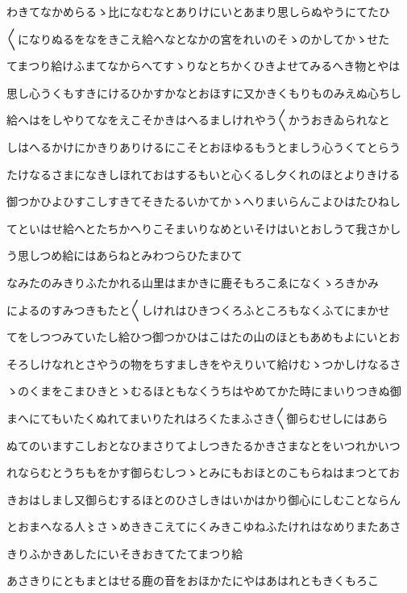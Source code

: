 \documentclass[a4paper,11pt,landscape]{ltjtarticle}
\begin{document}
\par\medskip
わきてなかめらるゝ比になむなとありけにいとあまり思しらぬやうにてたひ
\par\medskip
〱になりぬるをなをきこえ給へなとなかの宮をれいのそゝのかしてかゝせた
\par\medskip
てまつり給けふまてなからへてすゝりなとちかくひきよせてみるへき物とやは
\par\medskip
思し心うくもすきにけるひかすかなとおほすに又かきくもりものみえぬ心ちし
\par\medskip
給へはをしやりてなをえこそかきはへるましけれやう〱かうおきゐられなと
\par\medskip
しはへるかけにかきりありけるにこそとおほゆるもうとましう心うくてとらう
\par\medskip
たけなるさまになきしほれておはするもいと心くるし夕くれのほとよりきける
\par\medskip
御つかひよひすこしすきてそきたるいかてかゝへりまいらんこよひはたひねし
\par\medskip
てといはせ給へとたちかへりこそまいりなめといそけはいとおしうて我さかし
\par\medskip
う思しつめ給にはあらねとみわつらひたまひて
\par\medskip
なみたのみきりふたかれる山里はまかきに鹿そもろこゑになくゝろきかみ
\par\medskip
によるのすみつきもたと〱しけれはひきつくろふところもなくふてにまかせ
\par\medskip
てをしつつみていたし給ひつ御つかひはこはたの山のほともあめもよにいとお
\par\medskip
そろしけなれとさやうの物をちすましきをやえりいて給けむゝつかしけなるさ
\par\medskip
ゝのくまをこまひきとゝむるほともなくうちはやめてかた時にまいりつきぬ御
\par\medskip
まへにてもいたくぬれてまいりたれはろくたまふさき〱御らむせしにはあら
\par\medskip
ぬてのいますこしおとなひまさりてよしつきたるかきさまなとをいつれかいつ
\par\medskip
れならむとうちもをかす御らむしつゝとみにもおほとのこもらねはまつとてお
\par\medskip
きおはしまし又御らむするほとのひさしきはいかはかり御心にしむことならん
\par\medskip
とおまへなる人〻さゝめききこえてにくみきこゆねふたけれはなめりまたあさ
\par\medskip
きりふかきあしたにいそきおきてたてまつり給
\par\medskip
あさきりにともまとはせる鹿の音をおほかたにやはあはれともきくもろこ
\end{document}

